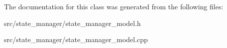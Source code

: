 The documentation for this class was generated from the following files\+:\begin{DoxyCompactItemize}
\item 
src/state\+\_\+manager/state\+\_\+manager\+\_\+model.\+h\item 
src/state\+\_\+manager/state\+\_\+manager\+\_\+model.\+cpp\end{DoxyCompactItemize}
